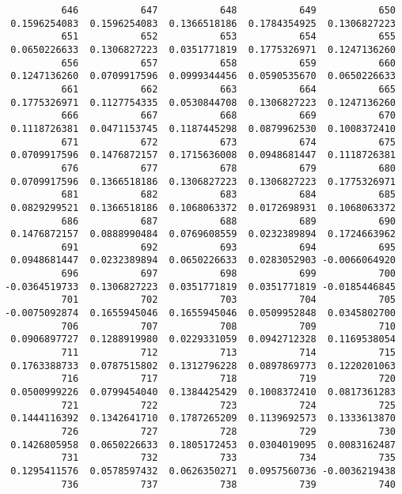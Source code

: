 \documentclass[
  letterpaper,
  DIV=11,
  numbers=noendperiod]{scrreprt}
\begin{document}
\begin{verbatim}
          646           647           648           649           650 
 0.1596254083  0.1596254083  0.1366518186  0.1784354925  0.1306827223 
          651           652           653           654           655 
 0.0650226633  0.1306827223  0.0351771819  0.1775326971  0.1247136260 
          656           657           658           659           660 
 0.1247136260  0.0709917596  0.0999344456  0.0590535670  0.0650226633 
          661           662           663           664           665 
 0.1775326971  0.1127754335  0.0530844708  0.1306827223  0.1247136260 
          666           667           668           669           670 
 0.1118726381  0.0471153745  0.1187445298  0.0879962530  0.1008372410 
          671           672           673           674           675 
 0.0709917596  0.1476872157  0.1715636008  0.0948681447  0.1118726381 
          676           677           678           679           680 
 0.0709917596  0.1366518186  0.1306827223  0.1306827223  0.1775326971 
          681           682           683           684           685 
 0.0829299521  0.1366518186  0.1068063372  0.0172698931  0.1068063372 
          686           687           688           689           690 
 0.1476872157  0.0888990484  0.0769608559  0.0232389894  0.1724663962 
          691           692           693           694           695 
 0.0948681447  0.0232389894  0.0650226633  0.0283052903 -0.0066064920 
          696           697           698           699           700 
-0.0364519733  0.1306827223  0.0351771819  0.0351771819 -0.0185446845 
          701           702           703           704           705 
-0.0075092874  0.1655945046  0.1655945046  0.0509952848  0.0345802700 
          706           707           708           709           710 
 0.0906897727  0.1288919980  0.0229331059  0.0942712328  0.1169538054 
          711           712           713           714           715 
 0.1763388733  0.0787515802  0.1312796228  0.0897869773  0.1220201063 
          716           717           718           719           720 
 0.0500999226  0.0799454040  0.1384425429  0.1008372410  0.0817361283 
          721           722           723           724           725 
 0.1444116392  0.1342641710  0.1787265209  0.1139692573  0.1333613870 
          726           727           728           729           730 
 0.1426805958  0.0650226633  0.1805172453  0.0304019095  0.0083162487 
          731           732           733           734           735 
 0.1295411576  0.0578597432  0.0626350271  0.0957560736 -0.0036219438 
          736           737           738           739           740 

\end{verbatim}
\end{document}

